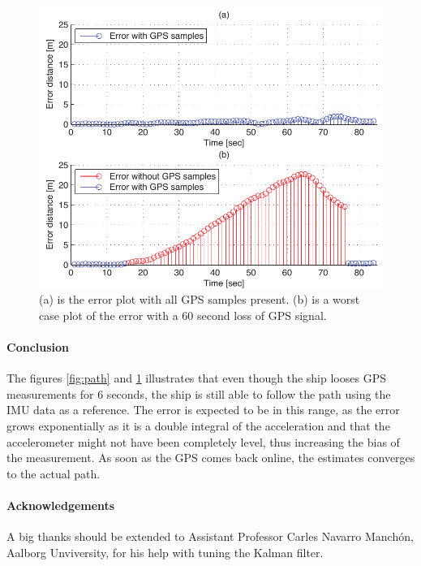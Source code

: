 \documentclass[a0,portrait]{a0poster}
\begin{document}
\begin{center}
{\begin{figure}
	\includegraphics[width=\threecolwidth]{img/error}
  	\caption{(a) is the error plot with all GPS samples present. (b) is a worst case plot of the error with a 60 second loss of GPS signal.}
	\label{fig:error}
\end{figure}


\paragraph{Conclusion}
The figures \ref{fig:path} and \ref{fig:error} illustrates that even though the ship looses GPS measurements for 6 seconds, the ship is still able to follow the path using the IMU data as a reference. The error is expected to be in this range, as the error grows exponentially as it is a double integral of the acceleration and that the accelerometer might not have been completely level, thus increasing the bias of the measurement. As soon as the GPS comes back online, the estimates converges to the actual path.

\paragraph{Acknowledgements} A big thanks should be extended to Assistant Professor Carles Navarro Manchón, Aalborg Unviversity, for his help with tuning the Kalman filter. 


}
\end{center}

\makefooter
\end{document}
